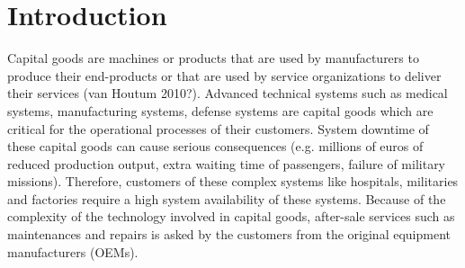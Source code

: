 \documentclass[preprint,12pt]{elsarticle}
\begin{document}
\nocite{*}

\begin{frontmatter}
\author{Qianru Ge}
\author{Hao Peng}
\author{Geert-Jan van Houtum}
\end{frontmatter}

\section{Introduction}

Capital goods are machines or products that are used by manufacturers to produce their end-products or
that are used by service organizations to deliver their services (van Houtum 2010?). Advanced technical systems such as medical systems, manufacturing systems, defense systems are capital goods which are critical for the operational processes of their customers. System downtime of these capital goods can cause serious consequences (e.g. millions of euros of reduced production output, extra waiting time of passengers, failure of military missions). Therefore, customers of these complex systems like hospitals, militaries and factories require a high system availability of these systems. Because of the complexity of the technology involved in capital goods, after-sale services such as maintenances and repairs is asked by the customers from the original equipment manufacturers (OEMs).
\end{document}
